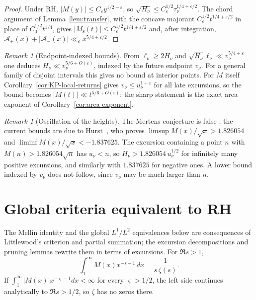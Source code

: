 \documentclass[11pt]{amsart}
\numberwithin{equation}{section}
\theoremstyle{plain}
\theoremstyle{definition}
\theoremstyle{remark}
\newtheorem{remark}[theorem]{Remark}
\newcommand{\Ms}{M_{\mathrm{s}}}
\newcommand{\Ap}{\mathcal{A}_{+}}
\newcommand{\Am}{\mathcal{A}_{-}}
\newcommand{\eps}{\varepsilon}
\begin{document}
\begin{proof}
Under RH, $|M(y)|\le C_\eps y^{1/2+\eps}$, so
$\sqrt{H_\nu}\le C_\eps^{1/2}\tau_\nu^{1/4+\eps/2}$. The chord argument of
Lemma~\ref{lem:transfer}, with the concave majorant
$C_\eps^{1/2}t^{1/4+\eps/2}$ in place of $C_0^{1/2}t^{1/4}$, gives
$|\Ms(t)|\le C_\eps^{1/2}t^{1/4+\eps/2}$ and, after integration,
$\Ap(x)+|\Am(x)|\ll_\eps x^{5/4+\eps/2}$.
\end{proof}

\begin{remark}[Endpoint-indexed bounds]
\label{rem:onedirection}
From $\ell_\nu\ge2H_\nu$ and $\sqrt{H_\nu}\ell_\nu\ll v_\nu^{5/4+\eps}$ one
deduces $H_\nu\ll v_\nu^{5/6+O(\eps)}$, indexed by the future endpoint
$v_\nu$. For a general family of disjoint intervals this gives no bound at
interior points. For $M$ itself Corollary~\ref{cor:KP-local-returns} gives
$v_\nu\le u_\nu^{1+\eps}$ for all late excursions, so the bound becomes
$|M(t)|\ll t^{5/6+O(\eps)}$; the sharp statement is the exact area exponent
of Corollary~\ref{cor:area-exponent}.
\end{remark}

\begin{remark}[Oscillation of the heights]
\label{rem:omega}
The Mertens conjecture is false \cite{OdlyzkoTeRiele1985,KotnikTeRiele2006};
the current bounds are due to Hurst~\cite{Hurst18}, who proves
$\limsup M(x)/\sqrt{x}>1.826054$ and
$\liminf M(x)/\sqrt{x}<-1.837625$. The excursion containing a point $n$ with
$M(n)>1.826054\sqrt n$ has $u_\nu<n$, so $H_\nu>1.826054\,u_\nu^{1/2}$ for
infinitely many positive excursions, and similarly with $1.837625$ for
negative ones. A lower bound indexed by $v_\nu$ does not follow, since
$v_\nu$ may be much larger than $n$.
\end{remark}


\section{Global criteria equivalent to RH}
\label{sec:criteria}

The Mellin identity and the global $L^1/L^2$ equivalences below are
consequences of Littlewood's criterion and partial summation; the excursion
decompositions and pruning lemmas rewrite them in terms of excursions.
For $\Re s>1$,
\begin{equation}
\label{eq:mellin_M}
  \int_1^\infty M(x)x^{-s-1}\,dx=\frac{1}{s\,\zeta(s)} .
\end{equation}
If $\int_1^\infty|M(x)|x^{-\varsigma-1}dx<\infty$ for every $\varsigma>1/2$, the
left side continues analytically to $\Re s>1/2$, so $\zeta$ has no zeros
there.
\end{document}
